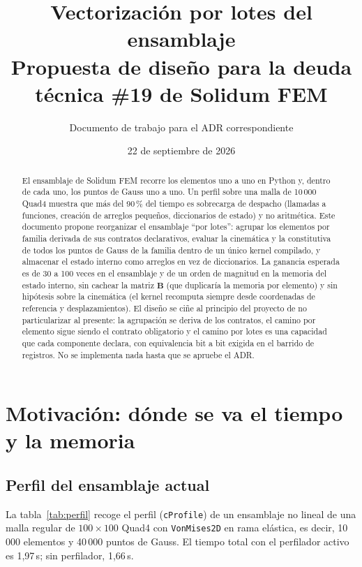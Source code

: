\documentclass[11pt,letterpaper,oneside]{article}
\title{\color{yamlkey}\textbf{Vectorización por lotes del ensamblaje}\\[4pt]
  \large\color{darkgray}Propuesta de diseño para la deuda técnica \#19 de Solidum FEM}
\author{Documento de trabajo para el ADR correspondiente}
\date{22 de septiembre de 2026}
\newcommand{\code}[1]{\texttt{#1}}
\begin{document}
\maketitle

\begin{abstract}
El ensamblaje de Solidum FEM recorre los elementos uno a uno en Python y, dentro de cada uno, los puntos de Gauss uno a uno. Un perfil sobre una malla de 10\,000 Quad4 muestra que más del 90\,\% del tiempo es sobrecarga de despacho (llamadas a funciones, creación de arreglos pequeños, diccionarios de estado) y no aritmética. Este documento propone reorganizar el ensamblaje ``por lotes'': agrupar los elementos por familia derivada de sus contratos declarativos, evaluar la cinemática y la constitutiva de todos los puntos de Gauss de la familia dentro de un único kernel compilado, y almacenar el estado interno como arreglos en vez de diccionarios. La ganancia esperada es de 30 a 100 veces en el ensamblaje y de un orden de magnitud en la memoria del estado interno, sin cachear la matriz $\mathbf B$ (que duplicaría la memoria por elemento) y sin hipótesis sobre la cinemática (el kernel recomputa siempre desde coordenadas de referencia y desplazamientos). El diseño se ciñe al principio del proyecto de no particularizar al presente: la agrupación se deriva de los contratos, el camino por elemento sigue siendo el contrato obligatorio y el camino por lotes es una capacidad que cada componente declara, con equivalencia bit a bit exigida en el barrido de registros. No se implementa nada hasta que se apruebe el ADR.
\end{abstract}

\tableofcontents
\newpage

\section{Motivación: dónde se va el tiempo y la memoria}

\subsection{Perfil del ensamblaje actual}

La tabla~\ref{tab:perfil} recoge el perfil (\code{cProfile}) de un ensamblaje no lineal de una malla regular de $100\times100$ Quad4 con \code{VonMises2D} en rama elástica, es decir, 10\,000 elementos y 40\,000 puntos de Gauss. El tiempo total con el perfilador activo es 1,97\,s; sin perfilador, 1,66\,s.
\end{document}
